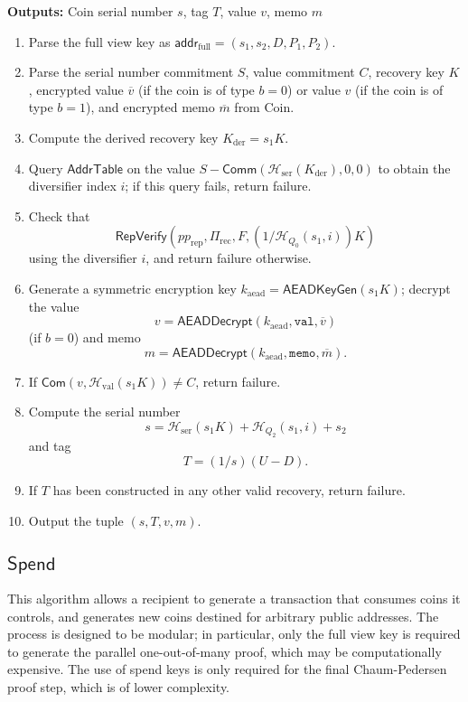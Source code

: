 \documentclass{llncs}
\newcommand{\hash}{\mathcal{H}}
\newcommand{\func}[1]{\mathsf{#1}}
\newcommand{\addr}{\func{addr}}
\newcommand{\com}{\func{Com}}
\newcommand{\comm}{\func{Comm}}
\begin{document}
\textbf{Outputs:} Coin serial number $s$, tag $T$, value $v$, memo $m$

\begin{enumerate}
\item Parse the full view key as $\addr_{\text{full}} = (s_1, s_2, D, P_1, P_2)$.
\item Parse the serial number commitment $S$, value commitment $C$, recovery key $K$, encrypted value $\overline{v}$ (if the coin is of type $b=0$) or value $v$ (if the coin is of type $b=1$), and encrypted memo $\overline{m}$ from $\text{Coin}$.
\item Compute the derived recovery key $K_{\text{der}} = s_1 K$.
\item Query $\func{AddrTable}$ on the value $S - \comm(\hash_{\text{ser}}(K_{\text{der}}),0,0)$ to obtain the diversifier index $i$; if this query fails, return failure.
\item Check that $$\func{RepVerify}(pp_{\text{rep}},\Pi_{\text{rec}},F,(1/\hash_{Q_0}(s_1,i))K)$$ using the diversifier $i$, and return failure otherwise.
\item Generate a symmetric encryption key $k_{\text{aead}} = \func{AEADKeyGen}(s_1 K)$; decrypt the value $$v = \func{AEADDecrypt}(k_{\text{aead}},\texttt{val},\overline{v})$$ (if $b=0$) and memo $$m = \func{AEADDecrypt}(k_{\text{aead}},\texttt{memo},\overline{m}).$$
\item If $\com(v,\hash_{\text{val}}(s_1 K)) \neq C$, return failure.
\item Compute the serial number $$s = \hash_{\text{ser}}(s_1 K) + \hash_{Q_2}(s_1,i) + s_2$$ and tag $$T = (1/s)(U - D).$$
\item If $T$ has been constructed in any other valid recovery, return failure.
\item Output the tuple $(s, T, v, m)$.
\end{enumerate}


\subsection{\texorpdfstring{$\func{Spend}$}{Spend}}

This algorithm allows a recipient to generate a transaction that consumes coins it controls, and generates new coins destined for arbitrary public addresses.
The process is designed to be modular; in particular, only the full view key is required to generate the parallel one-out-of-many proof, which may be computationally expensive.
The use of spend keys is only required for the final Chaum-Pedersen proof step, which is of lower complexity.
\end{document}
